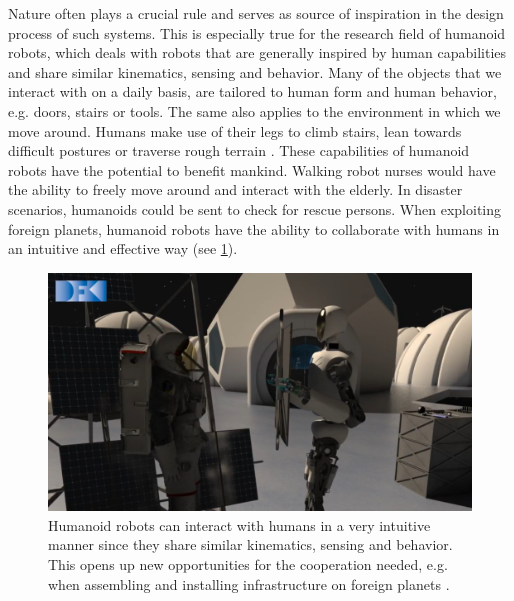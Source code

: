 Nature often plays a crucial rule and serves as source of inspiration in the design process of such systems. This is especially true for the research field of humanoid robots, which deals with robots that are generally inspired by human capabilities and share similar kinematics, sensing and behavior. Many of the objects that we interact with on a daily basis, are tailored to human form and human behavior, e.g. doors, stairs or tools. The same also applies to the environment in which we move around. Humans make use of their legs to climb stairs, lean towards difficult postures or traverse rough terrain \cite{fitzpatrick2016humanoids}. These capabilities of humanoid robots have the potential to benefit mankind. Walking robot nurses would have the ability to freely move around and interact with the elderly. In disaster scenarios, humanoids could be sent to check for rescue persons. When exploiting foreign planets, humanoid robots have the ability to collaborate with humans in an intuitive and effective way (see \cref{img:rh5_interactive}).   
\begin{figure}
\centering	
\includegraphics[width=.7\textwidth]{img/rh5_interactive_16_9}
\caption[Humanoid robots interact intuitively with humans]{Humanoid robots can interact with humans in a very intuitive manner since they share similar kinematics, sensing and behavior. This opens up new opportunities for the cooperation needed, e.g. when assembling and installing infrastructure on foreign planets \cite{img:rh5_interactive}.}
\label{img:rh5_interactive}
\end{figure} 
    

